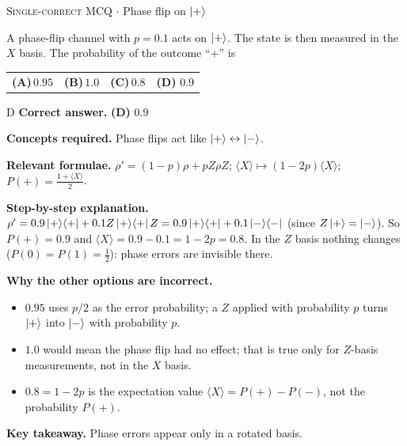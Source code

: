\documentclass[11pt,a4paper]{article}
\newcommand{\optlabel}[1]{\textbf{(#1)}}
\newcommand{\correctlabel}[1]{\textcolor{okgreen}{\textbf{(#1)}\,\ding{51}}}
\newenvironment{qitem}[1]{\begin{list}{}{\setlength{\leftmargin}{3.3em}\setlength{\labelwidth}{3.1em}%
  \setlength{\labelsep}{0.2em}\setlength{\topsep}{3pt}\setlength{\parsep}{3pt}}\item[\textbf{Q.#1}\hfill]}{\end{list}}
\newcommand{\qsep}{\par\vspace{2pt}{\color{black!15}\hrule}\vspace{4pt}}
\newcommand{\qmeta}[2]{{\footnotesize\color{black!60}\textsc{#1} \;$\cdot$\; #2}\par}
\begin{document}
\begin{qitem}{22}
\qmeta{Single-correct MCQ}{Phase flip on $\ket+$}
A phase-flip channel with $p = 0.1$ acts on $\ket+$. The state is then measured in the $X$ basis. The probability of the
outcome ``$+$'' is
\par\smallskip\noindent\begin{tabularx}{\linewidth}{@{}*{4}{L}@{}}
\optlabel{A}\,$0.95$ & \optlabel{B}\,$1.0$ & \optlabel{C}\,$0.8$ & \correctlabel{D}\,$0.9$
\end{tabularx}
\end{qitem}
\begin{solbox}{D}
\textbf{\color{brand}Correct answer.} \textcolor{okgreen}{\textbf{(D)}} $0.9$

\textbf{\color{brand}Concepts required.} Phase flips act like $\ket+ \leftrightarrow \ket-$.

\textbf{\color{brand}Relevant formulae.} $\rho' = (1-p)\rho + pZ\rho Z$; $\langle X\rangle \mapsto (1-2p)\langle X\rangle$; $P(+) = \frac{1 + \langle X\rangle}{2}$.

\textbf{\color{brand}Step-by-step explanation.} $\rho' = 0.9\ket+\!\bra+ + 0.1Z\ket+\!\bra+Z = 0.9\ket+\!\bra+ + 0.1\ket-\!\bra-$ (since $Z\ket+ = \ket-$). So $P(+) = 0.9$ and
$\langle X\rangle = 0.9 - 0.1 = 1 - 2p = 0.8$. In the $Z$ basis nothing changes ($P(0) = P(1) = \frac12$): phase errors are invisible there.

\textbf{\color{brand}Why the other options are incorrect.}
\begin{itemize}[leftmargin=2.4em, itemsep=1pt, topsep=2pt]
\item[\textbf{(A)}] $0.95$ uses $p/2$ as the error probability; a $Z$ applied with probability $p$ turns $\ket+$ into $\ket-$ with probability $p$.
\item[\textbf{(B)}] $1.0$ would mean the phase flip had no effect; that is true only for $Z$-basis measurements, not in the $X$ basis.
\item[\textbf{(C)}] $0.8 = 1 - 2p$ is the expectation value $\langle X\rangle = P(+) - P(-)$, not the probability $P(+)$.
\end{itemize}
\textbf{\color{brand}Key takeaway.} Phase errors appear only in a rotated basis.
\end{solbox}
\qsep
\end{document}
